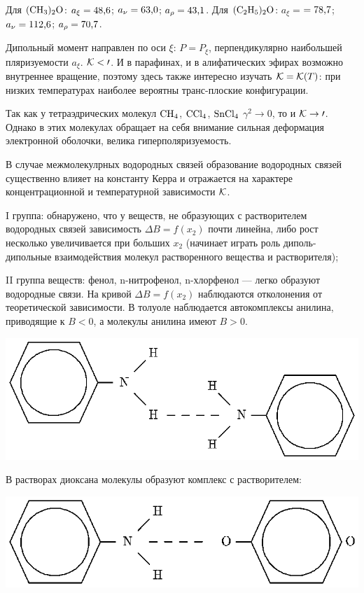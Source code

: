  Для $\rm (CH_3)_2O$: $a_{\xi}=\hbox{48,6}$; $a_{\nu}=\hbox{63,0}$;
$a_{\rho}=\hbox{43,1}$.
 Для $\rm (C_2H_5)_2O$: $a_{\xi}=$\linebreak$=\hbox{78,7}$; $a_{\nu}=\hbox{112,6}$;
$a_{\rho}=\hbox{70,7}$.\par
Дипольный момент направлен по оси $\xi$: $P=P_{\xi}$,
перпендикулярно наибольшей пляризуемости $a_{\xi}$. $\cal K<0$.
И в парафинах, и в алифатических эфирах возможно внутреннее
вращение, поэтому здесь также интересно изучать $\cal K=K(\mit
T)$: при низких температурах наиболее вероятны транс-плоские
конфигурации.\par
Так как у тетраэдрических молекул $\rm CH_4$, $\rm CCl_4$, $\rm SnCl_4$
$\gamma^2\rightarrow 0$, то и \hbox{$\cal K\rightarrow 0$}. Однако в
этих молекулах обращает на себя внимание сильная деформация
электронной оболочки, велика гиперполяризуемость.\par
В случае межмолекулрных водородных связей образование водородных
связей существенно влияет на константу Керра и отражается на
характере концентрационной и температурной зависимости $\cal K$.
\par I группа: обнаружено, что у веществ, не образующих с
растворителем водородных связей зависимость $\Delta B=f(x_2)$
почти линейна, либо рост несколько увеличивается при больших
$x_2$ (начинает играть роль диполь-дипольные взаимодействия
молекул растворенного вещества и растворителя);

II группа веществ: фенол, n-нитрофенол, n-хлорфенол --- легко
образуют водородные связи. На кривой $\Delta B=f(x_2)$
наблюдаются отколонения от теоретической зависимости. В толуоле
наблюдается автокомплексы анилина, приводящие к $B<0$, а молекулы
анилина имеют $B>0$.

\centerline{\hbox{\includegraphics[scale=0.69]{Ris/ris_eps/eff_kerr/anil.eps}}}

В растворах диоксана молекулы образуют комплекс с растворителем:

\centerline{\hbox{\includegraphics[scale=0.69]{Ris/ris_eps/eff_kerr/dioks.eps}}}
\par

